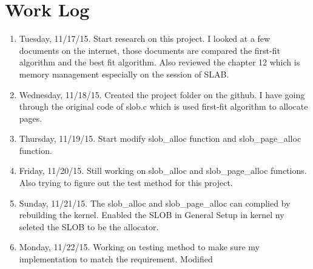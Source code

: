\documentclass[letterpaper,11pt,titlepage]{article}
\begin{document}
\section{Work Log}
\begin{enumerate}

\item Tuesday, 11/17/15. Start research on this project. I looked at a few documents on the internet, those documents are compared the first-fit algorithm and the best fit algorithm. Also reviewed the chapter 12 which is memory management especially on the session of SLAB.

\item Wednesday, 11/18/15. Created the project folder on the github. I have going through the original code of slob.c which is used first-fit algorithm to allocate pages. 
\item Thursday, 11/19/15. Start modify slob_alloc function and slob_page_alloc function.

\item Friday, 11/20/15. Still working on slob_alloc and slob_page_alloc functions. Also trying to figure out the test method for this project.
\item Sunday, 11/21/15. The slob_alloc and slob_page_alloc can complied by rebuilding the kernel. Enabled the SLOB in General Setup in kernel ny seleted the SLOB to be the allocator. 

\item Monday, 11/22/15. Working on testing method to make sure my implementation to match the requirement. Modified 

\end{enumerate}
\end{document}
